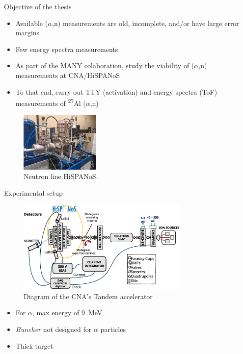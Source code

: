 \documentclass[11pt]{beamer}
\newcommand{\an}{($\alpha$,n) }
\newcommand{\Aliso}{\textsuperscript{27}Al }
\begin{document}
\begin{frame}{Objective of the thesis}
	\begin{itemize}
		\item Available \an measurements are old, incomplete, and/or have large error margins
		\item Few energy spectra measurements
		\item As part of the MANY colaboration, study the viability of \an measurements at CNA/HiSPANoS
		\item To that end, carry out TTY (activation) and energy spectra (ToF) measurements of \Aliso\an
	\end{itemize}
	\begin{figure}[H]
		\centering
		\includegraphics[width=0.35\textwidth]{neutronline_foto.jpg}
		\caption{Neutron line HiSPANoS.}
		\label{}
	\end{figure}
\end{frame}

\begin{frame}{Experimental setup}
	\begin{figure}[H]
		\centering
		\includegraphics[width=0.75\textwidth]{tandemdiagrama.eps}
		\caption{Diagram of the CNA's Tandem accelerator}
		\label{}
	\end{figure}
	\begin{itemize}
		\item For $\alpha$, max energy of \qty{9}{\MeV}
		\item \textit{Buncher} not designed for $\alpha$ particles
		\item Thick target
	\end{itemize}
\end{frame}
\end{document}
